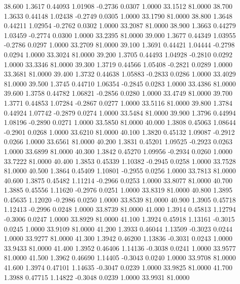   38.600   1.3617   0.44093   1.01908  -0.2736   0.0307   1.0000  33.1512  81.0000
  38.700   1.3633   0.44148   1.02438  -0.2749   0.0305   1.0000  33.1790  81.0000
  38.800   1.3648   0.44211   1.02954  -0.2762   0.0302   1.0000  33.2087  81.0000
  38.900   1.3663   0.44279   1.03459  -0.2774   0.0300   1.0000  33.2395  81.0000
  39.000   1.3677   0.44349   1.03955  -0.2786   0.0297   1.0000  33.2709  81.0000
  39.100   1.3691   0.44421   1.04444  -0.2798   0.0294   1.0000  33.3024  81.0000
  39.200   1.3705   0.44493   1.04928  -0.2810   0.0292   1.0000  33.3346  81.0000
  39.300   1.3719   0.44566   1.05408  -0.2821   0.0289   1.0000  33.3681  81.0000
  39.400   1.3732   0.44638   1.05883  -0.2833   0.0286   1.0000  33.4029  81.0000
  39.500   1.3745   0.44710   1.06354  -0.2845   0.0283   1.0000  33.4386  81.0000
  39.600   1.3758   0.44782   1.06821  -0.2856   0.0280   1.0000  33.4749  81.0000
  39.700   1.3771   0.44853   1.07284  -0.2867   0.0277   1.0000  33.5116  81.0000
  39.800   1.3784   0.44924   1.07742  -0.2879   0.0274   1.0000  33.5484  81.0000
  39.900   1.3796   0.44994   1.08196  -0.2890   0.0271   1.0000  33.5850  81.0000
  40.000   1.3808   0.45063   1.08644  -0.2901   0.0268   1.0000  33.6210  81.0000
  40.100   1.3820   0.45132   1.09087  -0.2912   0.0266   1.0000  33.6561  81.0000
  40.200   1.3831   0.45201   1.09525  -0.2923   0.0263   1.0000  33.6899  81.0000
  40.300   1.3842   0.45270   1.09956  -0.2934   0.0260   1.0000  33.7222  81.0000
  40.400   1.3853   0.45339   1.10382  -0.2945   0.0258   1.0000  33.7528  81.0000
  40.500   1.3864   0.45409   1.10801  -0.2955   0.0256   1.0000  33.7813  81.0000
  40.600   1.3875   0.45482   1.11214  -0.2966   0.0253   1.0000  33.8077  81.0000
  40.700   1.3885   0.45556   1.11620  -0.2976   0.0251   1.0000  33.8319  81.0000
  40.800   1.3895   0.45635   1.12020  -0.2986   0.0250   1.0000  33.8539  81.0000
  40.900   1.3905   0.45718   1.12413  -0.2996   0.0248   1.0000  33.8739  81.0000
  41.000   1.3914   0.45813   1.12794  -0.3006   0.0247   1.0000  33.8929  81.0000
  41.100   1.3924   0.45918   1.13161  -0.3015   0.0245   1.0000  33.9109  81.0000
  41.200   1.3933   0.46044   1.13509  -0.3023   0.0244   1.0000  33.9277  81.0000
  41.300   1.3942   0.46200   1.13836  -0.3031   0.0243   1.0000  33.9433  81.0000
  41.400   1.3952   0.46406   1.14136  -0.3038   0.0241   1.0000  33.9577  81.0000
  41.500   1.3962   0.46690   1.14405  -0.3043   0.0240   1.0000  33.9708  81.0000
  41.600   1.3974   0.47101   1.14635  -0.3047   0.0239   1.0000  33.9825  81.0000
  41.700   1.3988   0.47715   1.14822  -0.3048   0.0239   1.0000  33.9931  81.0000
